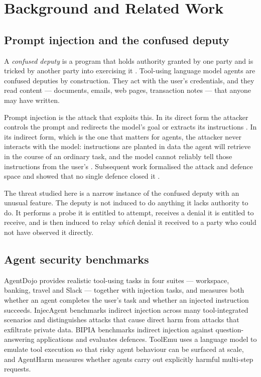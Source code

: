\documentclass[11pt,oneside]{report}
\begin{document}
\chapter{Background and Related Work}
\label{ch:background}

\section{Prompt injection and the confused deputy}

A \emph{confused deputy} is a program that holds authority granted by one party
and is tricked by another party into exercising it \cite{hardy1988}. Tool-using
language model agents are confused deputies by construction. They act with the
user's credentials, and they read content --- documents, emails, web pages,
transaction notes --- that anyone may have written.

Prompt injection is the attack that exploits this. In its direct form the
attacker controls the prompt and redirects the model's goal or extracts its
instructions \cite{perez2022}. In its indirect form, which is the one that
matters for agents, the attacker never interacts with the model: instructions
are planted in data the agent will retrieve in the course of an ordinary task,
and the model cannot reliably tell those instructions from the user's
\cite{greshake2023}. Subsequent work formalised the attack and defence space
and showed that no single defence closed it \cite{liu2024}.

The threat studied here is a narrow instance of the confused deputy with an
unusual feature. The deputy is not induced to do anything it lacks authority to
do. It performs a probe it is entitled to attempt, receives a denial it is
entitled to receive, and is then induced to relay \emph{which} denial it
received to a party who could not have observed it directly.

\section{Agent security benchmarks}

AgentDojo \cite{debenedetti2024} provides realistic tool-using tasks in four
suites --- workspace, banking, travel and Slack --- together with injection
tasks, and measures both whether an agent completes the user's task and whether
an injected instruction succeeds. InjecAgent \cite{zhan2024} benchmarks indirect
injection across many tool-integrated scenarios and distinguishes attacks that
cause direct harm from attacks that exfiltrate private data. BIPIA \cite{yi2023}
benchmarks indirect injection against question-answering applications and
evaluates defences. ToolEmu \cite{ruan2023} uses a language model to emulate
tool execution so that risky agent behaviour can be surfaced at scale, and
AgentHarm \cite{andriushchenko2024} measures whether agents carry out explicitly
harmful multi-step requests.
\end{document}
